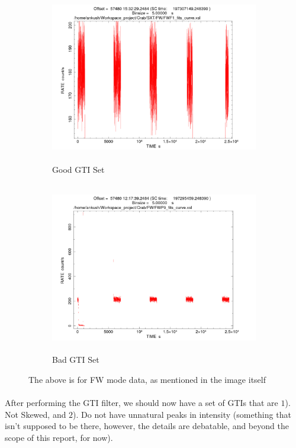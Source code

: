 \documentclass[a4paper,twoside]{report}
\numberwithin{equation}{section}
\begin{document}
\paragraph{}
\begin{figure}[h]
\begin{subfigure}{0.48\textwidth}
\includegraphics[width=1.0\linewidth, height=7.5cm]{Good_GTI.jpg} 
\caption{Good GTI Set}
\label{GTI_Good}
\end{subfigure}
\begin{subfigure}{0.48\textwidth}
\includegraphics[width=1.0\linewidth, height=7.5cm]{Bad_GTI.jpg}
\caption{Bad GTI Set}
\label{GTI_Bad}
\end{subfigure}
\caption{The above is for FW mode data, as mentioned in the image itself}
\label{Good_And_Bad_GTI}
\end{figure}
\paragraph{}
After performing the GTI filter, we should now have a set of GTIs that are $1$). Not Skewed, and $2$). Do not have unnatural peaks in intensity (something that isn’t supposed to be there, however, the details are debatable, and beyond the scope of this report, for now).
\end{document}
